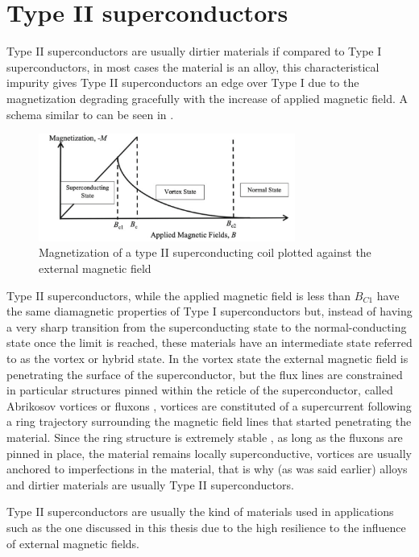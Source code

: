 \section{Type II superconductors}
\label{sec:type2}
Type II superconductors are usually dirtier materials if compared to Type I superconductors, in most
cases the material is an alloy, this characteristical impurity gives Type II superconductors an edge
over Type I due to the magnetization degrading gracefully with the increase of applied magnetic
field. A schema similar to  can be seen in .
\begin{figure}
	\centering
	\includegraphics[width=0.75\textwidth]{./img/type2.png}
	\caption{Magnetization of a type II superconducting coil plotted against the external magnetic field
		\cite{slimani2022superconducting}}
	\label{img:type2-transition}
\end{figure}
Type II superconductors, while the applied magnetic field is less than $B_{C1}$ have the same
diamagnetic properties of Type I superconductors but, instead of having a very sharp transition from the superconducting state to
the normal-conducting state once the limit is reached, these materials have an intermediate state referred to as the vortex or hybrid
state.
In the vortex state the external magnetic field is penetrating the surface of the superconductor, but the
flux lines are constrained in particular structures pinned within the reticle of the
superconductor, called Abrikosov vortices or fluxons \cite{abrikosov-vortices}, vortices are constituted of a supercurrent
following a ring trajectory surrounding the magnetic field lines that started penetrating the
material. Since the ring structure is extremely stable \cite{fujita-theory-HTS}, as long as the
fluxons are pinned in place, the material remains
locally superconductive, vortices are usually anchored to imperfections in the material, that is why
(as was said earlier) alloys and dirtier materials are usually Type II superconductors.

Type II superconductors are usually the kind of materials used in applications such as the one
discussed in this thesis due to the high resilience to the influence of external magnetic fields.


